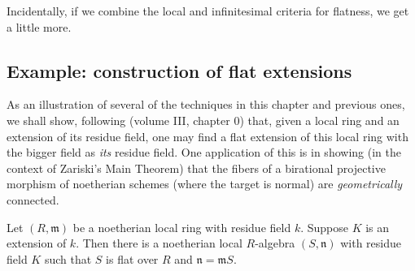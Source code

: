 Incidentally, if we combine the local and infinitesimal criteria for flatness, we get a little more.

\begin{comment}
\subsection{The $\gr$ criterion for flatness}

Suppose $(R, \mathfrak{m})$ is a noetherian local ring and $(S, \mathfrak{n})$
a local $R$-algebra.
As usual, we are interested in criteria for when a finitely generated
$S$-module $M$ is flat over $R$.

We can, of course, endow $M$ with the $\mathfrak{m}$-adic topology. 
Then $M$ is a filtered module over the filtered ring $R$ (with the
$\mathfrak{m}$-adic topology).
We have morphisms for each $i$,
\[ \mathfrak{m}^i/\mathfrak{m}^{i +1} \otimes_{R/\mathfrak{m}}
M/\mathfrak{m}M \to \mathfrak{m}^i M/\mathfrak{m}^{i+1} M  \]
that induce map
\[ \gr(R) \otimes_{R/\mathfrak{m}}  M/\mathfrak{m}M \to \gr(M). \]

If $M$ is flat over 
\end{comment}
\subsection{Example: construction of flat extensions}

As an illustration of several of the techniques in this chapter and previous
ones, we shall show, following \cite{EGA} (volume III, chapter 0) that, given a
local ring and an extension of its residue field, one may find a flat
extension of this local ring with the bigger field as \emph{its} residue
field. One application of this is in showing (in the context of Zariski's
Main Theorem) that the fibers of a birational
projective morphism of noetherian schemes (where the target is normal) are
\emph{geometrically} connected.

\begin{theorem} 
Let $(R, \mathfrak{m})$ be a noetherian local ring with residue field $k$.
Suppose $K$ is an extension of $k$. Then there is a noetherian local
$R$-algebra $(S,
\mathfrak{n})$ with residue field $K$ such that $S$ is flat over $R$ and $\mathfrak{n} =
\mathfrak{m}S$.
\end{theorem} 

